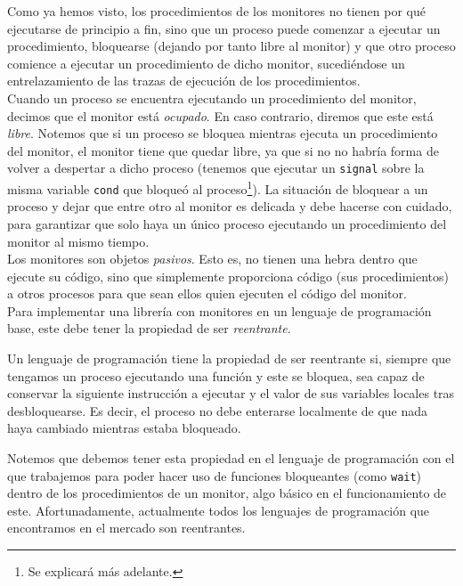 Como ya hemos visto, los procedimientos de los monitores no tienen por qué ejecutarse de principio a fin, sino que un proceso puede comenzar a ejecutar un procedimiento, bloquearse (dejando por tanto libre al monitor) y que otro proceso comience a ejecutar un procedimiento de dicho monitor, sucediéndose un entrelazamiento de las trazas de ejecución de los procedimientos.\\

Cuando un proceso se encuentra ejecutando un procedimiento del monitor, decimos que el monitor está \emph{ocupado}. En caso contrario, diremos que este está \emph{libre}. Notemos que si un proceso se bloquea mientras ejecuta un procedimiento del monitor, el monitor tiene que quedar libre, ya que si no no habría forma de volver a despertar a dicho proceso (tenemos que ejecutar un \verb|signal| sobre la misma variable \verb|cond| que bloqueó al proceso\footnote{Se explicará más adelante.}). La situación de bloquear a un proceso y dejar que entre otro al monitor es delicada y debe hacerse con cuidado, para garantizar que solo haya un único proceso ejecutando un procedimiento del monitor al mismo tiempo.\\

Los monitores son objetos \emph{pasivos}. Esto es, no tienen una hebra dentro que ejecute su código, sino que simplemente proporciona código (sus procedimientos) a otros procesos para que sean ellos quien ejecuten el código del monitor.\\

Para implementar una librería con monitores en un lenguaje de programación base, este debe tener la propiedad de ser \emph{reentrante}.
\begin{definicion}
    Un lenguaje de programación tiene la propiedad de ser reentrante si, siempre que tengamos un proceso ejecutando una función y este se bloquea, sea capaz de conservar la siguiente instrucción a ejecutar y el valor de sus variables locales tras desbloquearse. Es decir, el proceso no debe enterarse localmente de que nada haya cambiado mientras estaba bloqueado.
\end{definicion}
Notemos que debemos tener esta propiedad en el lenguaje de programación con el que trabajemos para poder hacer uso de funciones bloqueantes (como \verb|wait|) dentro de los procedimientos de un monitor, algo básico en el funcionamiento de este. Afortunadamente, actualmente todos los lenguajes de programación que encontramos en el mercado son reentrantes.\\

